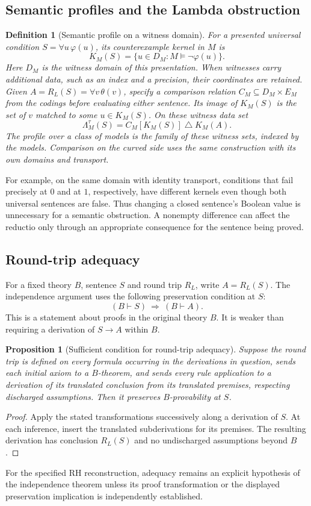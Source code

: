 \documentclass{article}
\newtheorem{proposition}[theorem]{Proposition}
\newtheorem{definition}[theorem]{Definition}
\theoremstyle{definition}
\begin{document}
\subsection{Semantic profiles and the Lambda obstruction}
\begin{definition}[Semantic profile on a witness domain]
For a presented universal condition $S=\forall u\,\varphi(u)$, its
counterexample kernel in $M$ is
\[
 K_M(S)=\{u\in D_M:M\models\neg\varphi(u)\}.
\]
Here $D_M$ is the witness domain of this presentation. When witnesses
carry additional data, such as an index and a precision, their coordinates
are retained. Given $A=R_L(S)=\forall v\,\theta(v)$, specify a comparison
relation $C_M\subseteq D_M\times E_M$ from the codings before evaluating
either sentence. Its image of $K_M(S)$ is the set of $v$ matched to
some $u\in K_M(S)$. On these witness data set
\[
 \Lambda^{\tau}_M(S)=C_M[K_M(S)]\mathbin{\triangle}K_M(A).
\]
The profile over a class of models is the family of these witness sets,
indexed by the models. Comparison on the curved side uses the same
construction with its own domains and transport.
\end{definition}
For example, on the same domain with identity transport, conditions that
fail precisely at $0$ and at $1$, respectively, have different kernels even
though both universal sentences are false. Thus changing a closed
sentence's Boolean value is unnecessary for a semantic obstruction.
A nonempty difference can affect the reductio only through an appropriate
consequence for the sentence being proved.

\subsection{Round-trip adequacy}
For a fixed theory $B$, sentence $S$ and round trip $R_L$, write $A=R_L(S)$.
The independence argument uses the following preservation condition at $S$:
\[
             (B\vdash S)\ \Longrightarrow\ (B\vdash A).
\tag{Adequacy}
\]
This is a statement about proofs in the original theory $B$. It is weaker
than requiring a derivation of $S\to A$ within $B$.

\begin{proposition}[Sufficient condition for round-trip adequacy]
\label{thm:round-trip-adequacy}
Suppose the round trip is defined on every formula occurring in the
derivations in question, sends each initial axiom to a $B$-theorem,
and sends every rule application to a derivation of its translated
conclusion from its translated premises, respecting discharged assumptions.
Then it preserves $B$-provability at $S$.
\end{proposition}
\begin{proof}
Apply the stated transformations successively along a derivation of $S$.
At each inference, insert the translated subderivations for its premises.
The resulting derivation has conclusion $R_L(S)$ and no undischarged
assumptions beyond $B$.
\end{proof}
For the specified RH reconstruction, adequacy remains an explicit hypothesis
of the independence theorem unless its proof transformation or the displayed
preservation implication is independently established.
\end{document}

